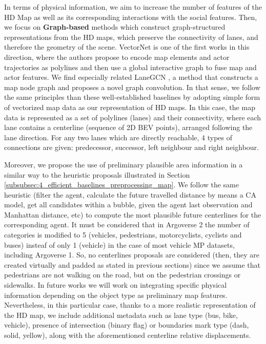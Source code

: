 In terms of physical information, we aim to increase the number of features of the HD Map as well as its corresponding interactions with the social features. Then, we focus on \textbf{Graph-based} methods \cite{zeng2021lanercnn} which construct graph-structured representations from the HD maps, which preserve the connectivity of lanes, and therefore the geometry of the scene. VectorNet \cite{gao2020vectornet} is one of the first works in this direction, where the authors propose to encode map elements and actor trajectories as polylines and then use a global interactive graph to fuse map and actor features. We find especially related LaneGCN \cite{liang2020learning}, a method that constructs a map node graph and proposes a novel graph convolution. In that sense, we follow the same principles than these well-established baselines by adopting simple form of vectorized map data as our representation of HD maps. In this case, the map data is represented as a set of polylines (lanes) and
their connectivity, where each lane contains a centerline (sequence of 2D \ac{BEV} points), arranged following the lane direction. For any two lanes which are directly reachable, 4 types of connections are given: predecessor, successor, left neighbour and right neighbour.

Moreover, we propose the use of preliminary plausible area information in a similar way to the heuristic proposals illustrated in Section \ref{subsubsec:4_efficient_baselines_preprocessing_map}. We follow the same heuristic (filter the agent, calculate the future travelled distance by means a CA model, get all candidates within a bubble, given the agent last observation and Manhattan distance, etc) to compute the most plausible future centerlines for the corresponding agent. It must be considered that in Argoverse 2 the number of categories is modified to 5 (vehicles, pedestrians, motorcyclists, cyclists and buses) insteaf of only 1 (vehicle) in the case of most vehicle \ac{MP} datasets, including Argoverse 1. So, no centerlines proposals are considered (then, they are created virtually and padded as stated in previous sections) since we assume that pedestrians are not walking on the road, but on the pedestrian crossings or sidewalks. In future works we will work on integrating specific physical information depending on the object type as preliminary map features. Nevertheless, in this particular case, thanks to a more realistic representation of the HD map, we include additional metadata such as lane type (bus, bike, vehicle), presence of intersection (binary flag) or boundaries mark type (dash, solid, yellow), along with the aforementioned centerline relative displacements. 

